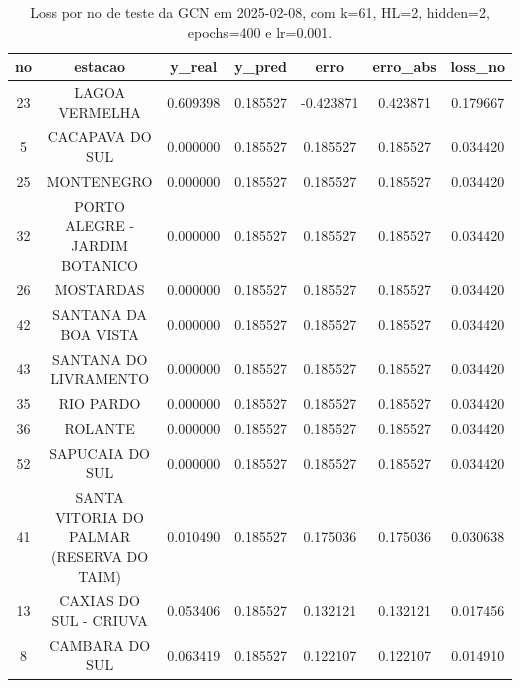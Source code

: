 \begin{table}[h]
\centering
\caption{Loss por no de teste da GCN em 2025-02-08, com k=61, HL=2, hidden=2, epochs=400 e lr=0.001.}
\label{tab:gcn_loss_k61_hl2_h2_e400_d20250208}
\begin{tabular}{ccccccc}
\toprule
no & estacao & y\_real & y\_pred & erro & erro\_abs & loss\_no \\
\midrule
23 & LAGOA VERMELHA & 0.609398 & 0.185527 & -0.423871 & 0.423871 & 0.179667 \\
5 & CACAPAVA DO SUL & 0.000000 & 0.185527 & 0.185527 & 0.185527 & 0.034420 \\
25 & MONTENEGRO & 0.000000 & 0.185527 & 0.185527 & 0.185527 & 0.034420 \\
32 & PORTO ALEGRE - JARDIM BOTANICO & 0.000000 & 0.185527 & 0.185527 & 0.185527 & 0.034420 \\
26 & MOSTARDAS & 0.000000 & 0.185527 & 0.185527 & 0.185527 & 0.034420 \\
42 & SANTANA DA BOA VISTA & 0.000000 & 0.185527 & 0.185527 & 0.185527 & 0.034420 \\
43 & SANTANA DO LIVRAMENTO & 0.000000 & 0.185527 & 0.185527 & 0.185527 & 0.034420 \\
35 & RIO PARDO & 0.000000 & 0.185527 & 0.185527 & 0.185527 & 0.034420 \\
36 & ROLANTE & 0.000000 & 0.185527 & 0.185527 & 0.185527 & 0.034420 \\
52 & SAPUCAIA DO SUL & 0.000000 & 0.185527 & 0.185527 & 0.185527 & 0.034420 \\
41 & SANTA VITORIA DO PALMAR (RESERVA DO TAIM) & 0.010490 & 0.185527 & 0.175036 & 0.175036 & 0.030638 \\
13 & CAXIAS DO SUL - CRIUVA & 0.053406 & 0.185527 & 0.132121 & 0.132121 & 0.017456 \\
8 & CAMBARA DO SUL & 0.063419 & 0.185527 & 0.122107 & 0.122107 & 0.014910 \\
\bottomrule
\end{tabular}
\end{table}
